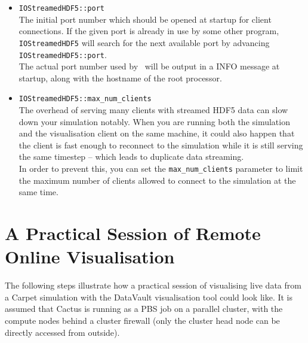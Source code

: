 \documentclass{article}
\begin{document}
\begin{itemize}
  \item {\tt IOStreamedHDF5::port}\\
        The initial port number which should be opened at startup for
        client connections. If the given port is already in use by some other
        program, {\tt IOStreamedHDF5} will search for the next available port
        by advancing {\tt IOStreamedHDF5::port}.\\
        The actual port number used by \ThisThorn\ will be output in a INFO
        message at startup, along with the hostname of the root processor.

  \item {\tt IOStreamedHDF5::max\_num\_clients}\\
        The overhead of serving many clients with streamed HDF5 data can slow
        down your simulation notably. When you are running both the simulation
        and the visualisation client on the same machine, it could also happen
        that the client is fast enough to reconnect to the simulation while
        it is still serving the same timestep -- which leads to duplicate
        data streaming.\\
        In order to prevent this, you can set the {\tt max\_num\_clients}
        parameter to limit the maximum number of clients allowed to connect
        to the simulation at the same time.

\end{itemize}


\section{A Practical Session of Remote Online Visualisation}

The following steps illustrate how a practical session of visualising
live data from a Carpet simulation with the DataVault visualisation tool
could look like.
It is assumed that Cactus is running as a PBS job on a parallel cluster,
with the compute nodes behind a cluster firewall (only the cluster head node
can be directly accessed from outside).
\end{document}
